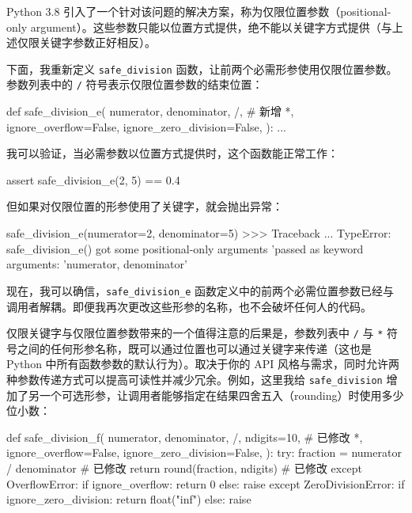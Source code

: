 Python 3.8 引入了一个针对该问题的解决方案，称为仅限位置参数（positional-only argument）。这些参数只能以位置方式提供，绝不能以关键字方式提供（与上述仅限关键字参数正好相反）。

下面，我重新定义 \texttt{safe\_division} 函数，让前两个必需形参使用仅限位置参数。参数列表中的 \texttt{/} 符号表示仅限位置参数的结束位置：

\begin{codebox}[python]
def safe_division_e(
    numerator,
    denominator,
    /,  # 新增
    *,
    ignore_overflow=False,
    ignore_zero_division=False,
):
    ...
\end{codebox}

我可以验证，当必需参数以位置方式提供时，这个函数能正常工作：

\begin{codebox}[python]
assert safe_division_e(2, 5) == 0.4
\end{codebox}

但如果对仅限位置的形参使用了关键字，就会抛出异常：

\begin{codebox}[python]
safe_division_e(numerator=2, denominator=5)
>>>
Traceback ...
TypeError: safe_division_e() got some positional-only arguments
'passed as keyword arguments: 'numerator, denominator'
\end{codebox}

现在，我可以确信，\texttt{safe\_division\_e} 函数定义中的前两个必需位置参数已经与调用者解耦。即便我再次更改这些形参的名称，也不会破坏任何人的代码。

仅限关键字与仅限位置参数带来的一个值得注意的后果是，参数列表中 \texttt{/} 与 \texttt{*} 符号之间的任何形参名称，既可以通过位置也可以通过关键字来传递（这也是 Python 中所有函数参数的默认行为）。取决于你的 API 风格与需求，同时允许两种参数传递方式可以提高可读性并减少冗余。例如，这里我给 \texttt{safe\_division} 增加了另一个可选形参，让调用者能够指定在结果四舍五入（rounding）时使用多少位小数：

\begin{codebox}[python]
def safe_division_f(
    numerator,
    denominator,
    /,
    ndigits=10,  # 已修改
    *,
    ignore_overflow=False,
    ignore_zero_division=False,
):
    try:
        fraction = numerator / denominator  # 已修改
        return round(fraction, ndigits)     # 已修改
    except OverflowError:
        if ignore_overflow:
            return 0
        else:
            raise
    except ZeroDivisionError:
        if ignore_zero_division:
            return float("inf")
        else:
            raise
\end{codebox}

